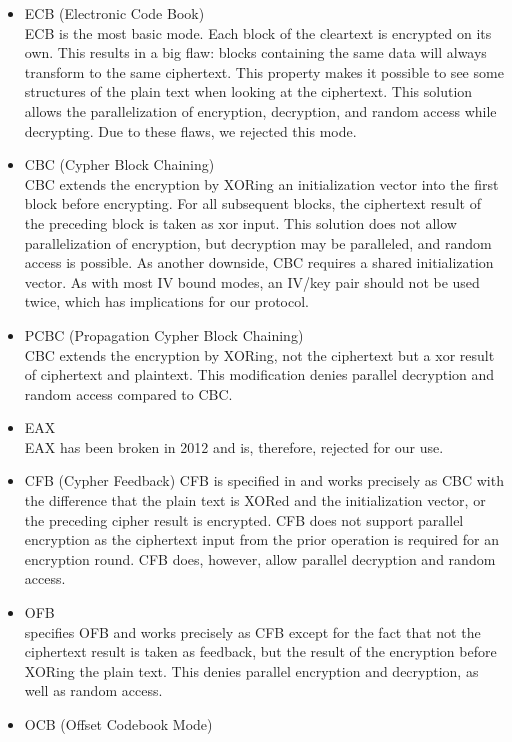 \begin{itemize}
	\item ECB (Electronic Code Book)\\
	ECB is the most basic mode. Each block of the cleartext is encrypted on its own. This results in a big flaw: blocks containing the same data will always transform to the same ciphertext. This property makes it possible to see some structures of the plain text when looking at the ciphertext. This solution allows the parallelization of encryption, decryption, and random access while decrypting. Due to these flaws, we rejected this mode.
	\item CBC (Cypher Block Chaining)\\  
	CBC extends the encryption by XORing an initialization vector into the first block before encrypting. For all subsequent blocks, the ciphertext result of the preceding block is taken as xor input. This solution does not allow parallelization of encryption, but decryption may be paralleled, and random access is possible. As another downside, CBC requires a shared initialization vector. As with most IV bound modes, an IV/key pair should not be used twice, which has implications for our protocol.
	\item PCBC (Propagation Cypher Block Chaining)\\
	CBC extends the encryption by XORing, not the ciphertext but a xor result of ciphertext and plaintext. This modification denies parallel decryption and random access compared to CBC.
	\item EAX\\      
	EAX has been broken in 2012\cite{minematsu2013attacks} and is, therefore, rejected for our use.
	\item CFB (Cypher Feedback)
	CFB is specified in \cite{dworkin2001recommendation} and works precisely as CBC with the difference that the plain text is XORed and the initialization vector, or the preceding cipher result is encrypted. CFB does not support parallel encryption as the ciphertext input from the prior operation is required for an encryption round. CFB does, however, allow parallel decryption and random access.
	\item OFB\\
	\cite{dworkin2001recommendation} specifies OFB and works precisely as CFB except for the fact that not the ciphertext result is taken as feedback, but the result of the encryption before XORing the plain text. This denies parallel encryption and decryption, as well as random access.
	\item OCB (Offset Codebook Mode)\\

\end{itemize}
